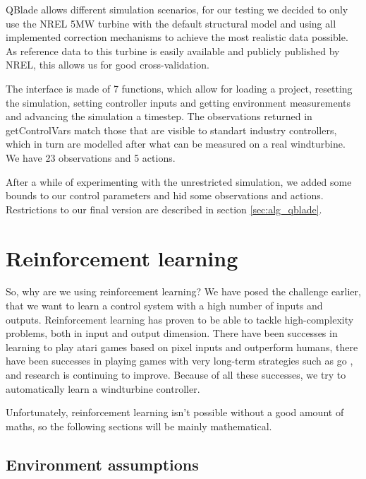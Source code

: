 \documentclass[hyperref,beleg]{cgvpub}
\begin{document}
QBlade allows different simulation scenarios, for our testing we decided to only use the NREL 5MW \cite{jonkmanDefinition5MWReference2009} turbine with the default structural model and using all implemented correction mechanisms to achieve the most realistic data possible. As reference data to this turbine is easily available and publicly published by NREL, this allows us for good cross-validation.

The interface is made of 7 functions, which allow for loading a project, resetting the simulation, setting controller inputs and getting environment measurements and advancing the simulation a timestep. The observations returned in getControlVars match those that are visible to standart industry controllers, which in turn are modelled after what can be measured on a real windturbine. We have 23 observations and 5 actions.

After a while of experimenting with the unrestricted simulation, we added some bounds to our control parameters and hid some observations and actions. Restrictions to our final version are described in section \ref{sec:alg_qblade}.

\section{Reinforcement learning}

So, why are we using reinforcement learning? We have posed the challenge earlier, that we want to learn a control system with a high number of inputs and outputs. Reinforcement learning has proven to be able to tackle high-complexity problems, both in input and output dimension. There have been successes in learning to play atari games based on pixel inputs \cite{mnihPlayingAtariDeep2013} and outperform humans, there have been successes in playing games with very long-term strategies such as go \cite{silverMasteringGameGo2016}, and research is continuing to improve. Because of all these successes, we try to automatically learn a windturbine controller.

Unfortunately, reinforcement learning isn't possible without a good amount of maths, so the following sections will be mainly mathematical.

\subsection{Environment assumptions}
\end{document}
